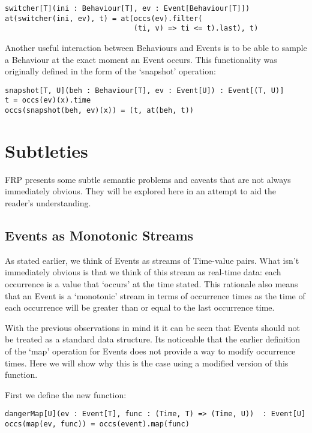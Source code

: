 \begin{verbatim}
switcher[T](ini : Behaviour[T], ev : Event[Behaviour[T]])
at(switcher(ini, ev), t) = at(occs(ev).filter(
                              (ti, v) => ti <= t).last), t)
\end{verbatim}

        Another useful interaction between Behaviours and Events is to be able to sample
        a Behaviour at the exact moment an Event occurs. This functionality was originally defined in the
        form of the `snapshot' operation:

\begin{verbatim}
snapshot[T, U](beh : Behaviour[T], ev : Event[U]) : Event[(T, U)]
t = occs(ev)(x).time
occs(snapshot(beh, ev)(x)) = (t, at(beh, t))
\end{verbatim} 
  
  \section{Subtleties}
    FRP presents some subtle semantic problems and caveats that are not always immediately obvious.
    They will be explored here in an attempt to aid the reader's understanding.
     
    \subsection{Events as Monotonic Streams}
      As stated earlier, we think of Events as streams of Time-value pairs. What isn't immediately
      obvious is that we think of this stream as real-time data: each occurrence is a value that
      `occurs' at the time stated. This rationale also means that an Event is a `monotonic' stream in terms of
      occurrence times as the time of each occurrence will be greater than or equal to the last occurrence
      time.
      
      With the previous observations in mind it it can be seen that Events should not be treated as a
      standard data structure. Its noticeable that the earlier definition of the `map' operation for
      Events does not provide a way to modify occurrence times. Here we will show why this is
      the case using a modified version of this function.
      
      First we define the new function:
      
\begin{verbatim}
dangerMap[U](ev : Event[T], func : (Time, T) => (Time, U))  : Event[U]
occs(map(ev, func)) = occs(event).map(func)
\end{verbatim}

